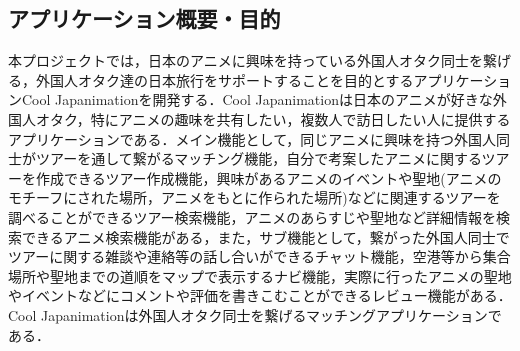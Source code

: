 \subsection{アプリケーション概要・目的}
\par
本プロジェクトでは，日本のアニメに興味を持っている外国人オタク同士を繋げる，外国人オタク達の日本旅行をサポートすることを目的とするアプリケーションCool Japanimationを開発する．Cool Japanimationは日本のアニメが好きな外国人オタク，特にアニメの趣味を共有したい，複数人で訪日したい人に提供するアプリケーションである．メイン機能として，同じアニメに興味を持つ外国人同士がツアーを通して繋がるマッチング機能，自分で考案したアニメに関するツアーを作成できるツアー作成機能，興味があるアニメのイベントや聖地(アニメのモチーフにされた場所，アニメをもとに作られた場所)などに関連するツアーを調べることができるツアー検索機能，アニメのあらすじや聖地など詳細情報を検索できるアニメ検索機能がある，また，サブ機能として，繋がった外国人同士でツアーに関する雑談や連絡等の話し合いができるチャット機能，空港等から集合場所や聖地までの道順をマップで表示するナビ機能，実際に行ったアニメの聖地やイベントなどにコメントや評価を書きこむことができるレビュー機能がある．Cool Japanimationは外国人オタク同士を繋げるマッチングアプリケーションである．
